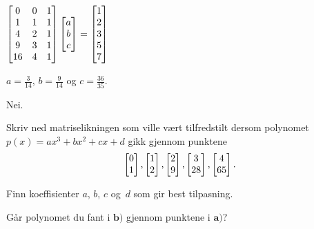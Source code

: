 \begin{losning}
\begin{punkt}
$
\begin{bmatrix}
0 & 0 & 1\\
1 & 1 & 1\\
4 & 2 & 1\\
9 & 3 & 1\\
16 & 4 & 1
\end{bmatrix}\begin{bmatrix} a \\ b \\ c \end{bmatrix}=\begin{bmatrix}
1\\
2\\
3\\
5\\
7
\end{bmatrix}$
\end{punkt}

\begin{punkt}
$a=\frac{3}{14}$, $b=\frac{9}{14}$ og $c=\frac{36}{35}$.
\end{punkt}

\begin{punkt}
Nei.
\end{punkt}

\end{losning}


\begin{oppgave}

\begin{punkt}
Skriv ned matriselikningen som ville vært tilfredstilt dersom polynomet $p(x)=ax^3+bx^2+cx+d$ gikk gjennom punktene
$$\begin{bmatrix} 0 \\ 1 \end{bmatrix}, \begin{bmatrix} 1 \\ 2 \end{bmatrix}, \begin{bmatrix} 2 \\ 9 \end{bmatrix},\begin{bmatrix} 3 \\ 28 \end{bmatrix},\begin{bmatrix} 4 \\ 65 \end{bmatrix}.$$ 
\end{punkt}


\begin{punkt}
Finn koeffisienter $a$, $b$, $c$ og~$d$ som gir best tilpasning.
\end{punkt}

\begin{punkt}
Går polynomet du fant i $\textbf{b)}$ gjennom punktene i $\textbf{a)}$?
\end{punkt}

\end{oppgave}

